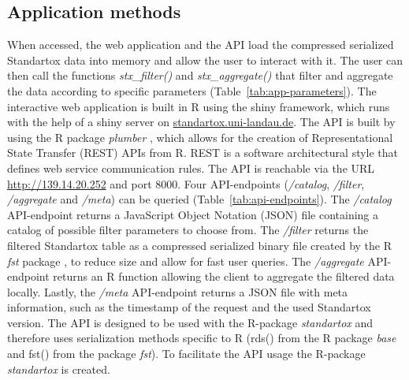 \documentclass[journal,datadescriptor,submit,moreauthors,pdftex]{Definitions/mdpi}
\begin{document}
\subsection{Application methods}
When accessed, the web application and the API load the compressed serialized Standartox data into memory and allow the user to interact with it. The user can then call the functions \textit{stx\_filter()} and \textit{stx\_aggregate()} that filter and aggregate the data according to specific parameters (Table~\ref{tab:app-parameters}). The interactive web application is built in R using the shiny framework, which runs with the help of a shiny server \citep{R-shiny} on \url{standartox.uni-landau.de}. The API is built by using the R package \textit{plumber} \citep{R-plumber}, which allows for the creation of Representational State Transfer (REST) APIs from R. REST is a software architectural style that defines web service communication rules. The API is reachable via the URL \url{http://139.14.20.252} and port 8000. Four API-endpoints (\textit{/catalog}, \textit{/filter}, \textit{/aggregate} and \textit{/meta}) can be queried (Table~\ref{tab:api-endpoints}). The \textit{/catalog} API-endpoint returns a JavaScript Object Notation (JSON) file containing a catalog of possible filter parameters to choose from. The \textit{/filter} returns the filtered Standartox table as a compressed serialized binary file created by the R \textit{fst} package \citep{R-fst}, to reduce size and allow for fast user queries. The \textit{/aggregate} API-endpoint returns an R function allowing the client to aggregate the filtered data locally. Lastly, the \textit{/meta} API-endpoint returns a JSON file with meta information, such as the timestamp of the request and the used Standartox version. The API is designed to be used with the R-package \textit{standartox} and therefore uses serialization methods specific to R (rds() from the R package \textit{base} and fst() from the package \textit{fst}). To facilitate the API usage the R-package \textit{standartox} is created.
\end{document}

